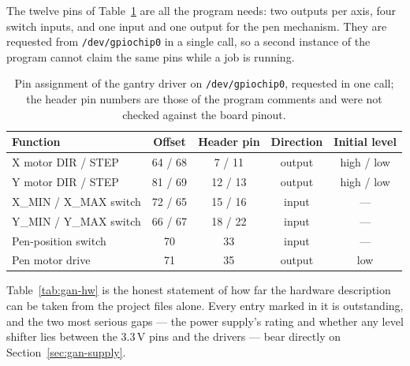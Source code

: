 The twelve pins of Table~\ref{tab:gan-pins} are all the program needs: two outputs per axis, four switch inputs, and one input and one output for the pen mechanism. They are requested from \texttt{/dev/gpiochip0} in a single call, so a second instance of the program cannot claim the same pins while a job is running.

\begin{table}[!htbp]
\centering
\fontsize{9.5}{11.5}\selectfont
\begin{tabularx}{\linewidth}{|X|c|c|c|c|}
\hline
\textbf{Function} & \textbf{Offset} & \textbf{Header pin} & \textbf{Direction} & \textbf{Initial level} \\
\hline
X motor DIR / STEP & 64 / 68 & 7 / 11 & output & high / low \\
\hline
Y motor DIR / STEP & 81 / 69 & 12 / 13 & output & high / low \\
\hline
X\_MIN / X\_MAX switch & 72 / 65 & 15 / 16 & input & --- \\
\hline
Y\_MIN / Y\_MAX switch & 66 / 67 & 18 / 22 & input & --- \\
\hline
Pen-position switch & 70 & 33 & input & --- \\
\hline
Pen motor drive & 71 & 35 & output & low \\
\hline
\end{tabularx}
\caption{Pin assignment of the gantry driver on \texttt{/dev/gpiochip0}, requested in one call; the header pin numbers are those of the program comments and were not checked against the board pinout.}
\label{tab:gan-pins}
\end{table}

Table~\ref{tab:gan-hw} is the honest statement of how far the hardware description can be taken from the project files alone. Every entry marked in it is outstanding, and the two most serious gaps --- the power supply's rating and whether any level shifter lies between the 3.3\,V pins and the drivers --- bear directly on Section~\ref{sec:gan-supply}.

